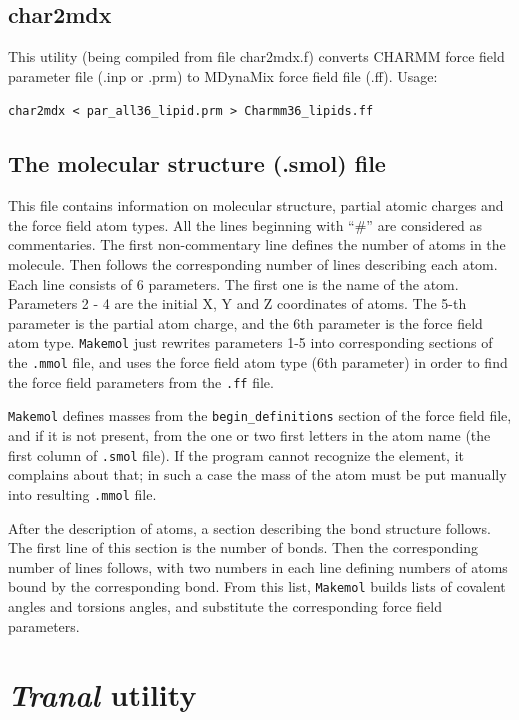 \documentclass{article}
\begin{document}
\subsection{char2mdx}

This utility (being compiled from file char2mdx.f) converts CHARMM 
force field parameter file (.inp or .prm) to MDynaMix force field file (.ff).
Usage:

\verb|char2mdx < par_all36_lipid.prm > Charmm36_lipids.ff|

\subsection{The molecular structure (.smol) file}

This file contains information on molecular structure, partial atomic 
charges and the force field atom types. All the lines beginning with 
``\#'' are considered as commentaries. The first non-commentary line
defines the number of atoms in the molecule. Then follows the corresponding
number of lines describing each atom. Each line consists of 6 parameters.
The first one is the name of the atom. Parameters 2 - 4 are the initial 
X, Y and Z coordinates of atoms. The 5-th parameter is the partial atom
charge, and the 6th parameter is the force field atom type. \verb|Makemol| 
just rewrites parameters 1-5 into corresponding sections of the \verb|.mmol| 
file, and uses the force field atom type (6th parameter) in order to
find the force field parameters from the \verb|.ff| file.

\verb|Makemol| defines masses from the \verb|begin_definitions| section of 
the force field file, and if it is not present,  from the one or two first 
letters in the atom name (the first column of \verb|.smol| file). 
If the program cannot 
recognize the element, it complains about that; in such a case the mass of 
the atom must be put manually into resulting \verb|.mmol| file.

After the description of atoms, a section describing the bond structure 
follows. The first line of this section is the number of bonds. Then
the corresponding number of lines follows, with two numbers in each line 
defining numbers of atoms bound by the corresponding bond. From this list, 
\verb|Makemol| builds lists of covalent angles and torsions angles, and
substitute the corresponding force field parameters.


\section{{\em Tranal} utility}
\end{document}
